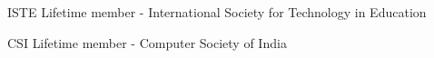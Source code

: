 

\begin{cvskills}

  \cvskill
    {ISTE} %
    {Lifetime member - International Society for Technology in Education} %

  \cvskill
    {CSI} %
    {Lifetime member - Computer Society of India} %


\end{cvskills}
